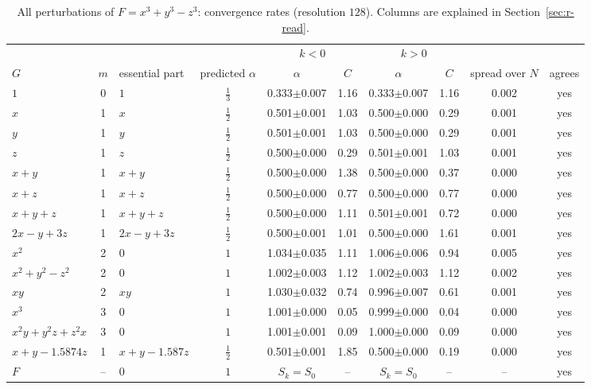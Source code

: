 \documentclass[12pt, a4paper]{article}
\theoremstyle{plain}
\theoremstyle{definition}
\theoremstyle{remark}
\theoremstyle{definition}
\begin{document}
\begin{table}[!h]
\centering
\footnotesize
\begin{adjustbox}{max width=\textwidth}
\begin{tabular}{l c l c c c c c c c}
\toprule
& & & & \multicolumn{2}{c}{$k<0$} & \multicolumn{2}{c}{$k>0$} & & \\
\cmidrule(lr){5-6}\cmidrule(lr){7-8}
$G$ & $m$ & essential part & predicted $\alpha$ & $\alpha$ & $C$ & $\alpha$ & $C$ & spread over $N$ & agrees \\
\midrule
$1$ & 0 & $1$ & $\tfrac13$ & 0.333{\scriptsize$\pm$0.007} & 1.16 & 0.333{\scriptsize$\pm$0.007} & 1.16 & 0.002 & yes \\
$x$ & 1 & $x$ & $\tfrac12$ & 0.501{\scriptsize$\pm$0.001} & 1.03 & 0.500{\scriptsize$\pm$0.000} & 0.29 & 0.001 & yes \\
$y$ & 1 & $y$ & $\tfrac12$ & 0.501{\scriptsize$\pm$0.001} & 1.03 & 0.500{\scriptsize$\pm$0.000} & 0.29 & 0.001 & yes \\
$z$ & 1 & $z$ & $\tfrac12$ & 0.500{\scriptsize$\pm$0.000} & 0.29 & 0.501{\scriptsize$\pm$0.001} & 1.03 & 0.001 & yes \\
$x+y$ & 1 & $x + y$ & $\tfrac12$ & 0.500{\scriptsize$\pm$0.000} & 1.38 & 0.500{\scriptsize$\pm$0.000} & 0.37 & 0.000 & yes \\
$x+z$ & 1 & $x + z$ & $\tfrac12$ & 0.500{\scriptsize$\pm$0.000} & 0.77 & 0.500{\scriptsize$\pm$0.000} & 0.77 & 0.000 & yes \\
$x+y+z$ & 1 & $x + y + z$ & $\tfrac12$ & 0.500{\scriptsize$\pm$0.000} & 1.11 & 0.501{\scriptsize$\pm$0.001} & 0.72 & 0.000 & yes \\
$2x-y+3z$ & 1 & $2x - y + 3z$ & $\tfrac12$ & 0.500{\scriptsize$\pm$0.001} & 1.01 & 0.500{\scriptsize$\pm$0.000} & 1.61 & 0.001 & yes \\
$x^2$ & 2 & $0$ & $1$ & 1.034{\scriptsize$\pm$0.035} & 1.11 & 1.006{\scriptsize$\pm$0.006} & 0.94 & 0.005 & yes \\
$x^2+y^2-z^2$ & 2 & $0$ & $1$ & 1.002{\scriptsize$\pm$0.003} & 1.12 & 1.002{\scriptsize$\pm$0.003} & 1.12 & 0.002 & yes \\
$xy$ & 2 & $xy$ & $1$ & 1.030{\scriptsize$\pm$0.032} & 0.74 & 0.996{\scriptsize$\pm$0.007} & 0.61 & 0.001 & yes \\
$x^3$ & 3 & $0$ & $1$ & 1.001{\scriptsize$\pm$0.000} & 0.05 & 0.999{\scriptsize$\pm$0.000} & 0.04 & 0.000 & yes \\
$x^2y+y^2z+z^2x$ & 3 & $0$ & $1$ & 1.001{\scriptsize$\pm$0.001} & 0.09 & 1.000{\scriptsize$\pm$0.000} & 0.09 & 0.000 & yes \\
$x+y-1.5874z$ & 1 & $x + y - 1.587z$ & $\tfrac12$ & 0.501{\scriptsize$\pm$0.001} & 1.85 & 0.500{\scriptsize$\pm$0.000} & 0.19 & 0.000 & yes \\
$F$ & -- & $0$ & $1$ & $S_k=S_0$ & -- & $S_k=S_0$ & -- & -- & yes \\
\bottomrule
\end{tabular}
\end{adjustbox}
\caption[Rates for $x^3+y^3-z^3$]{All perturbations of $F=x^3+y^3-z^3$: convergence rates (resolution $128$). Columns are explained in Section~\ref{sec:r-read}.}
\label{tab:r-E6b-rates}
\end{table}
\end{document}
